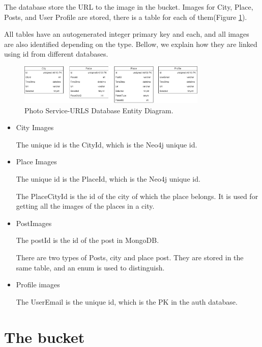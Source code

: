 The database store the URL to the image in the bucket. Images for City, Place, Posts, and User Profile are stored, there is a table for each of them(Figure \ref{photo:dbentity}).

All tables have an autogenerated integer primary key and each, and all images are also identified depending on the type. Bellow, we explain how they are linked using id from different databases.


\begin{figure}
	\begin{center}
		\includegraphics[width=90mm,scale=1]{img/photos/photo-db-entity.png}
		\caption{Photo Service-URLS Database Entity Diagram.}
		\label{photo:dbentity}
	\end{center}
\end{figure}

\begin{itemize}
	\item City Images
	
	\subitem The unique id is the CityId, which is the Neo4j unique id.
	
	\item	Place Images
	
	\subitem	The unique id is the PlaceId, which is the Neo4j unique id.
	
	\subitem The PlaceCityId is the id of the city of which the place belongs. It is used for getting all the images of the places in a city. 
	
	\item	PostImages
	
	\subitem The postId is the id of the post in MongoDB.
	
	\subitem There are two types of Posts, city and place post. They are stored in the same table, and an enum is used to distinguish.
	
	\item	Profile images
	
	\subitem The  UserEmail is the unique id, which is the PK in the auth database.
\end{itemize}

\section{The bucket}

